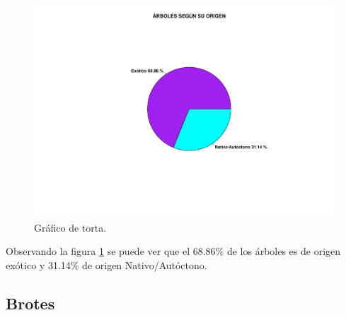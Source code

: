 \documentclass[11pt]{article}
\begin{document}
\begin{figure}[h!]
  \begin{center}
    \includegraphics[width=0.9\linewidth]{pieOrigen.pdf}
    \caption{Gráfico de torta.}
    \label{fig:pieOrigen}
  \end{center}  
\end{figure}

\begin{justify}
  Observando la figura \ref{fig:pieOrigen} se puede ver que el 68.86\% de los
  árboles es de origen exótico y 31.14\% de origen Nativo/Autóctono.
\end{justify}


\newpage
\subsection{Brotes}
\end{document}
